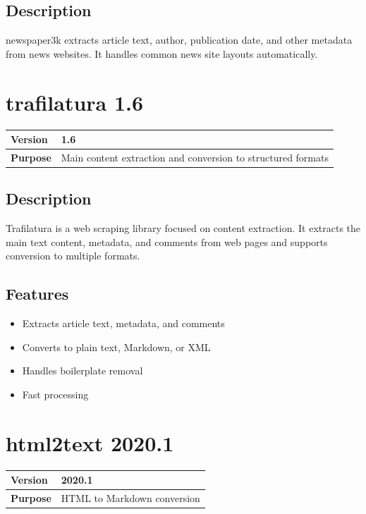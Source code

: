 \documentclass[12pt,a4paper]{report}
\begin{document}
\subsection{Description}

newspaper3k extracts article text, author, publication date, and other metadata from news websites. It handles common news site layouts automatically.

\section{trafilatura 1.6}

\begin{tabular}{|p{4cm}|p{10cm}|}
\hline
\textbf{Version} & 1.6 \\
\hline
\textbf{Purpose} & Main content extraction and conversion to structured formats \\
\hline
\end{tabular}

\subsection{Description}

Trafilatura is a web scraping library focused on content extraction. It extracts the main text content, metadata, and comments from web pages and supports conversion to multiple formats.

\subsection{Features}

\begin{itemize}
    \item Extracts article text, metadata, and comments
    \item Converts to plain text, Markdown, or XML
    \item Handles boilerplate removal
    \item Fast processing
\end{itemize}

\section{html2text 2020.1}

\begin{tabular}{|p{4cm}|p{10cm}|}
\hline
\textbf{Version} & 2020.1 \\
\hline
\textbf{Purpose} & HTML to Markdown conversion \\
\hline
\end{tabular}
\end{document}
